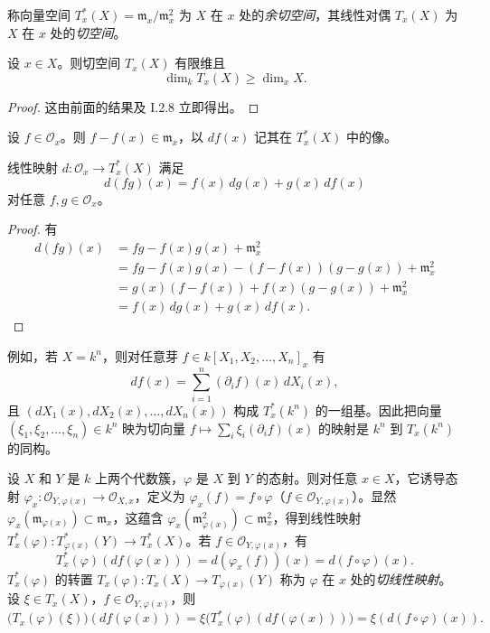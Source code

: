 称向量空间 $T_x^*(X)=\mathfrak{m}_x/\mathfrak{m}_x^2$ 为 $X$ 在 $x$ 处的\emph{余切空间}，其线性对偶 $T_x(X)$ 为 $X$ 在 $x$ 处的\emph{切空间}。

\begin{proposition}
设 $x\in X$。则切空间 $T_x(X)$ 有限维且
$$\dim_k T_x(X)\ge\dim_x X.$$
\end{proposition}

\begin{proof}
这由前面的结果及 I.2.8 立即得出。
\end{proof}

设 $f\in\mathcal{O}_x$。则 $f-f(x)\in\mathfrak{m}_x$，以 $df(x)$ 记其在 $T_x^*(X)$ 中的像。

\begin{lemma}
线性映射 $d:\mathcal{O}_x\to T_x^*(X)$ 满足
$$d(fg)(x)=f(x)\,dg(x)+g(x)\,df(x)$$
对任意 $f,g\in\mathcal{O}_x$。
\end{lemma}

\begin{proof}
有
\begin{align*}
d(fg)(x)&=fg-f(x)g(x)+\mathfrak{m}_x^2\\
&=fg-f(x)g(x)-(f-f(x))(g-g(x))+\mathfrak{m}_x^2\\
&=g(x)(f-f(x))+f(x)(g-g(x))+\mathfrak{m}_x^2\\
&=f(x)\,dg(x)+g(x)\,df(x).
\end{align*}
\end{proof}

例如，若 $X=k^n$，则对任意芽 $f\in k[X_1,X_2,\dots,X_n]_x$ 有
$$df(x)=\sum_{i=1}^n(\partial_i f)(x)\,dX_i(x),$$
且 $(dX_1(x),dX_2(x),\dots,dX_n(x))$ 构成 $T_x^*(k^n)$ 的一组基。因此把向量 $(\xi_1,\xi_2,\dots,\xi_n)\in k^n$ 映为切向量 $f\longmapsto\sum_i\xi_i(\partial_i f)(x)$ 的映射是 $k^n$ 到 $T_x(k^n)$ 的同构。

设 $X$ 和 $Y$ 是 $k$ 上两个代数簇，$\varphi$ 是 $X$ 到 $Y$ 的态射。则对任意 $x\in X$，它诱导态射 $\varphi_x:\mathcal{O}_{Y,\varphi(x)}\to\mathcal{O}_{X,x}$，定义为 $\varphi_x(f)=f\circ\varphi$（$f\in\mathcal{O}_{Y,\varphi(x)}$）。显然 $\varphi_x(\mathfrak{m}_{\varphi(x)})\subset\mathfrak{m}_x$，这蕴含 $\varphi_x(\mathfrak{m}^2_{\varphi(x)})\subset\mathfrak{m}_x^2$，得到线性映射 $T^*_x(\varphi):T^*_{\varphi(x)}(Y)\to T^*_x(X)$。若 $f\in\mathcal{O}_{Y,\varphi(x)}$，有
$$T^*_x(\varphi)(df(\varphi(x)))=d(\varphi_x(f))(x)=d(f\circ\varphi)(x).$$
$T^*_x(\varphi)$ 的转置 $T_x(\varphi):T_x(X)\to T_{\varphi(x)}(Y)$ 称为 $\varphi$ 在 $x$ 处的\emph{切线性映射}。设 $\xi\in T_x(X)$，$f\in\mathcal{O}_{Y,\varphi(x)}$，则
$$\bigl(T_x(\varphi)(\xi)\bigr)(df(\varphi(x)))=\xi\bigl(T^*_x(\varphi)(df(\varphi(x)))\bigr)=\xi(d(f\circ\varphi)(x)).$$

